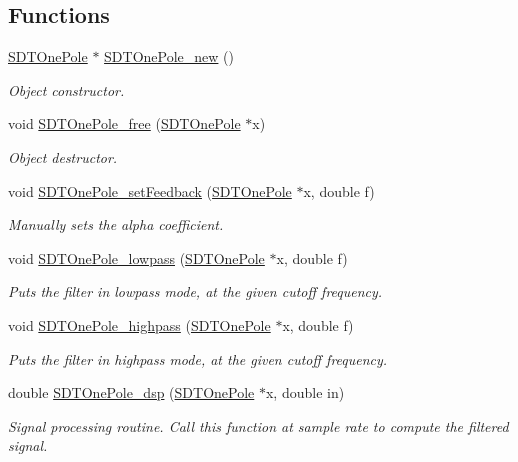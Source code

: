 \subsection*{Functions}
\begin{DoxyCompactItemize}
\item 
\hyperlink{group__onepole_gaf029661adfbccd326c286c801bfcdd01}{S\+D\+T\+One\+Pole} $\ast$ \hyperlink{group__onepole_ga576752a0253d0c601ef81669d72df786}{S\+D\+T\+One\+Pole\+\_\+new} ()
\begin{DoxyCompactList}\small\item\em Object constructor. \end{DoxyCompactList}\item 
void \hyperlink{group__onepole_ga9045b072e02d583a5ba8cd241a681580}{S\+D\+T\+One\+Pole\+\_\+free} (\hyperlink{group__onepole_gaf029661adfbccd326c286c801bfcdd01}{S\+D\+T\+One\+Pole} $\ast$x)
\begin{DoxyCompactList}\small\item\em Object destructor. \end{DoxyCompactList}\item 
void \hyperlink{group__onepole_ga9bd83dc031322ae0bbbae14fff1ab028}{S\+D\+T\+One\+Pole\+\_\+set\+Feedback} (\hyperlink{group__onepole_gaf029661adfbccd326c286c801bfcdd01}{S\+D\+T\+One\+Pole} $\ast$x, double f)
\begin{DoxyCompactList}\small\item\em Manually sets the alpha coefficient. \end{DoxyCompactList}\item 
void \hyperlink{group__onepole_gaf4b868ac1d8e47b7b8831dd892805bb4}{S\+D\+T\+One\+Pole\+\_\+lowpass} (\hyperlink{group__onepole_gaf029661adfbccd326c286c801bfcdd01}{S\+D\+T\+One\+Pole} $\ast$x, double f)
\begin{DoxyCompactList}\small\item\em Puts the filter in lowpass mode, at the given cutoff frequency. \end{DoxyCompactList}\item 
void \hyperlink{group__onepole_ga24acad97eb378be5d39d80695514b491}{S\+D\+T\+One\+Pole\+\_\+highpass} (\hyperlink{group__onepole_gaf029661adfbccd326c286c801bfcdd01}{S\+D\+T\+One\+Pole} $\ast$x, double f)
\begin{DoxyCompactList}\small\item\em Puts the filter in highpass mode, at the given cutoff frequency. \end{DoxyCompactList}\item 
double \hyperlink{group__onepole_ga051260b3e1b165bed970723f2b63d791}{S\+D\+T\+One\+Pole\+\_\+dsp} (\hyperlink{group__onepole_gaf029661adfbccd326c286c801bfcdd01}{S\+D\+T\+One\+Pole} $\ast$x, double in)
\begin{DoxyCompactList}\small\item\em Signal processing routine. Call this function at sample rate to compute the filtered signal. \end{DoxyCompactList}\end{DoxyCompactItemize}


